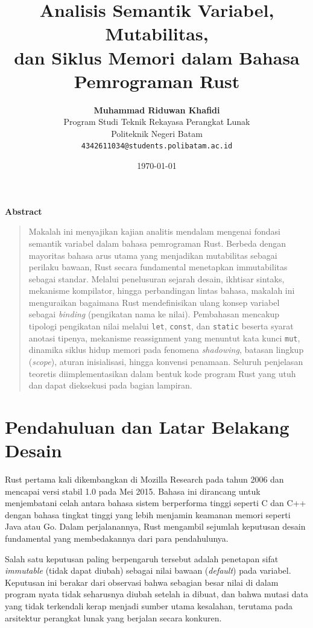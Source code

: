 \documentclass[11pt,a4paper]{article}
\title{\vspace{-1.5cm}\textbf{\sffamily\LARGE Analisis Semantik Variabel, Mutabilitas,\\ dan Siklus Memori dalam Bahasa Pemrograman Rust}}
\author{
	\textbf{Muhammad Riduwan Khafidi} \\
	\small Program Studi Teknik Rekayasa Perangkat Lunak \\
	\small Politeknik Negeri Batam \\
	\small \texttt{4342611034@students.polibatam.ac.id}
}
\date{\small\today}
\renewenvironment{abstract}
{\small
	\begin{center}\textbf{\sffamily Abstract}\end{center}
	\begin{quote}}
	{\end{quote}}
\begin{document}
\maketitle
\thispagestyle{empty}

\begin{abstract}
	Makalah ini menyajikan kajian analitis mendalam mengenai fondasi semantik variabel dalam bahasa pemrograman Rust. Berbeda dengan mayoritas bahasa arus utama yang menjadikan mutabilitas sebagai perilaku bawaan, Rust secara fundamental menetapkan immutabilitas sebagai standar. Melalui penelusuran sejarah desain, ikhtisar sintaks, mekanisme kompilator, hingga perbandingan lintas bahasa, makalah ini menguraikan bagaimana Rust mendefinisikan ulang konsep variabel sebagai \textit{binding} (pengikatan nama ke nilai). Pembahasan mencakup tipologi pengikatan nilai melalui \texttt{let}, \texttt{const}, dan \texttt{static} beserta syarat anotasi tipenya, mekanisme reassignment yang menuntut kata kunci \texttt{mut}, dinamika siklus hidup memori pada fenomena \textit{shadowing}, batasan lingkup (\textit{scope}), aturan inisialisasi, hingga konvensi penamaan. Seluruh penjelasan teoretis diimplementasikan dalam bentuk kode program Rust yang utuh dan dapat dieksekusi pada bagian lampiran.
\end{abstract}

\section{Pendahuluan dan Latar Belakang Desain}

Rust pertama kali dikembangkan di Mozilla Research pada tahun 2006 dan mencapai versi stabil 1.0 pada Mei 2015. Bahasa ini dirancang untuk menjembatani celah antara bahasa sistem berperforma tinggi seperti C dan C++ dengan bahasa tingkat tinggi yang lebih menjamin keamanan memori seperti Java atau Go. Dalam perjalanannya, Rust mengambil sejumlah keputusan desain fundamental yang membedakannya dari para pendahulunya.

Salah satu keputusan paling berpengaruh tersebut adalah penetapan sifat \textit{immutable} (tidak dapat diubah) sebagai nilai bawaan (\textit{default}) pada variabel. Keputusan ini berakar dari observasi bahwa sebagian besar nilai di dalam program nyata tidak seharusnya diubah setelah ia dibuat, dan bahwa mutasi data yang tidak terkendali kerap menjadi sumber utama kesalahan, terutama pada arsitektur perangkat lunak yang berjalan secara konkuren.
\end{document}
